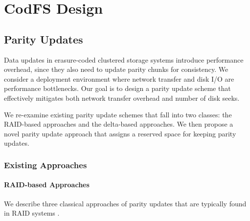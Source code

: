\chapter{CodFS Design}
\label{chap:codfs}

\section{Parity Updates}
\label{sec:parity}

Data updates in erasure-coded clustered storage systems introduce performance
overhead, since they also need to update parity chunks for consistency.  We
consider a deployment environment where network transfer and disk I/O are
performance bottlenecks.  Our goal is to design a parity update scheme that
effectively mitigates both network transfer overhead and number of disk seeks.


We re-examine existing parity update schemes
that fall into two classes: the RAID-based approaches and the delta-based
approaches. 
We then propose a novel parity update approach that assigns a reserved space
for keeping parity updates. 

\subsection{Existing Approaches}

\subsubsection{RAID-based Approaches}

We describe three classical approaches of parity updates that are typically
found in RAID systems \cite{chen95,thomasian05}. 

